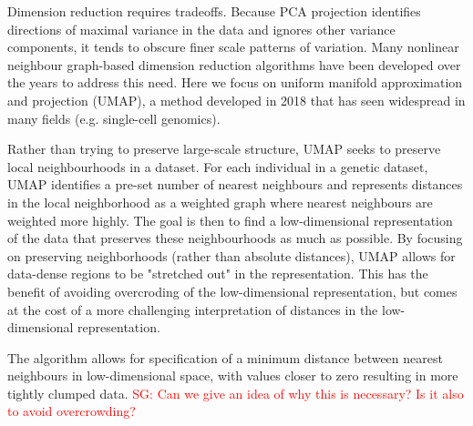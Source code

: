 \documentclass[12pt]{article}
\newcommand{\sgcomment}[1]{\textcolor{red}{SG: #1}}
\begin{document}
Dimension reduction requires tradeoffs. Because PCA projection identifies directions of maximal variance in the data and ignores other variance components, it tends to obscure finer scale patterns of variation.  Many nonlinear neighbour graph-based dimension reduction algorithms have been developed over the years to address this need. Here we focus on uniform manifold approximation and projection (UMAP)\cite{mcinnes_umap_2018}, a method developed in 2018 that has seen widespread in many fields (e.g. single-cell genomics\cite{becht_dimensionality_2019}). 

Rather than trying to preserve large-scale structure, UMAP seeks to preserve local neighbourhoods in a dataset. For each individual in a genetic dataset, UMAP identifies a pre-set number of nearest neighbours and represents distances in the local neighborhood as a weighted graph where nearest neighbours are weighted more highly. The goal is then to find a low-dimensional representation of the data that preserves these neighbourhoods as much as possible. By focusing on preserving neighborhoods (rather than absolute distances), UMAP allows for data-dense regions to be "stretched out" in the representation. This has the benefit of avoiding overcroding of the low-dimensional representation, but comes at the cost of a more challenging interpretation of distances in the low-dimensional representation.  





The algorithm allows for specification of a minimum distance between nearest neighbours in low-dimensional space, with values closer to zero resulting in more tightly clumped data. \sgcomment{Can we give an idea of why this is necessary? Is it also to avoid overcrowding?}
\end{document}
